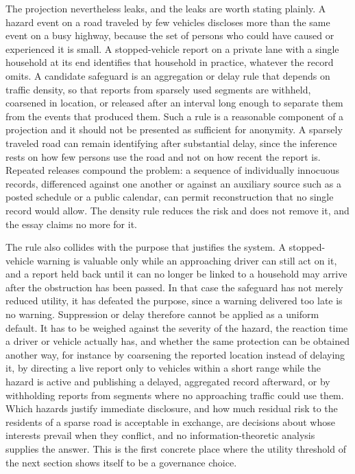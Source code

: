 \documentclass[11pt]{article}
\theoremstyle{definition}
\begin{document}
The projection nevertheless leaks, and the leaks are worth stating plainly. A hazard event on a road traveled by few vehicles discloses more than the same event on a busy highway, because the set of persons who could have caused or experienced it is small. A stopped-vehicle report on a private lane with a single household at its end identifies that household in practice, whatever the record omits. A candidate safeguard is an aggregation or delay rule that depends on traffic density, so that reports from sparsely used segments are withheld, coarsened in location, or released after an interval long enough to separate them from the events that produced them. Such a rule is a reasonable component of a projection and it should not be presented as sufficient for anonymity. A sparsely traveled road can remain identifying after substantial delay, since the inference rests on how few persons use the road and not on how recent the report is. Repeated releases compound the problem: a sequence of individually innocuous records, differenced against one another or against an auxiliary source such as a posted schedule or a public calendar, can permit reconstruction that no single record would allow. The density rule reduces the risk and does not remove it, and the essay claims no more for it.

The rule also collides with the purpose that justifies the system. A stopped-vehicle warning is valuable only while an approaching driver can still act on it, and a report held back until it can no longer be linked to a household may arrive after the obstruction has been passed. In that case the safeguard has not merely reduced utility, it has defeated the purpose, since a warning delivered too late is no warning. Suppression or delay therefore cannot be applied as a uniform default. It has to be weighed against the severity of the hazard, the reaction time a driver or vehicle actually has, and whether the same protection can be obtained another way, for instance by coarsening the reported location instead of delaying it, by directing a live report only to vehicles within a short range while the hazard is active and publishing a delayed, aggregated record afterward, or by withholding reports from segments where no approaching traffic could use them. Which hazards justify immediate disclosure, and how much residual risk to the residents of a sparse road is acceptable in exchange, are decisions about whose interests prevail when they conflict, and no information-theoretic analysis supplies the answer. This is the first concrete place where the utility threshold of the next section shows itself to be a governance choice.
\end{document}
